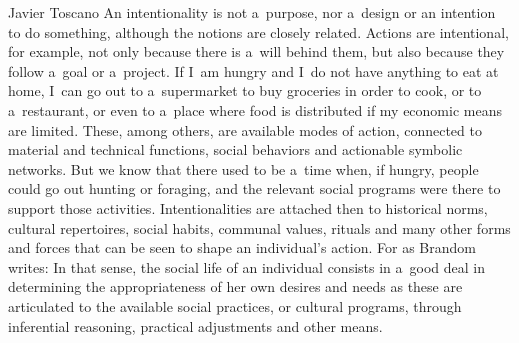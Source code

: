 \begin{artengenv}{Javier Toscano}
An intentionality is not a~purpose, nor a~design or an intention to do something, although the notions are closely related. Actions are intentional, for example, not only because there is a~will behind them, but also because they follow a~goal or a~project. If I~am hungry and I~do not have anything to eat at home, I~can go out to a~supermarket to buy groceries in order to cook, or to a~restaurant, or even to a~place where food is distributed if my economic means are limited. These, among others, are available modes of action, connected to material and technical functions, social behaviors and actionable symbolic networks. But we know that there used to be a~time when, if hungry, people could go out hunting or foraging, and the relevant social programs were there to support those activities. Intentionalities are attached then to historical norms, cultural repertoires, social habits, communal values, rituals and many other forms and forces that can be seen to shape an individual's action. For as Brandom
\parencite*[][p.61]{brandom_making_1994} %
 writes: 
 In that sense, the social life of an individual consists in a~good deal in determining the appropriateness of her own desires and needs as these are articulated to the available social practices, or cultural programs, through inferential reasoning, practical adjustments and other means.


\end{artengenv}
